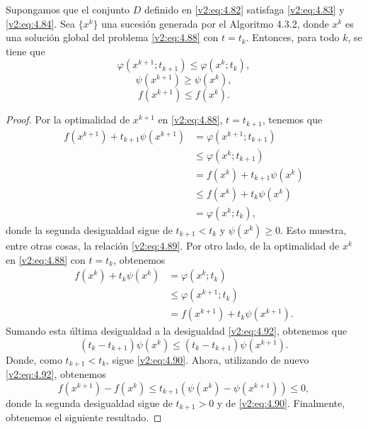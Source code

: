 \begin{proposition}\label{v2:prop:4.3.3}
    Supongamos que el conjunto $D$ definido en \eqref{v2:eq:4.82} satisfaga \eqref{v2:eq:4.83} y \eqref{v2:eq:4.84}. Sea $\{x^k\}$ una sucesión generada por el Algoritmo 4.3.2, donde $x^k$ es una solución global del problema \eqref{v2:eq:4.88} con $t = t_k$.
    Entonces, para todo $k$, se tiene que
    \begin{equation}
        \varphi(x^{k+1}; t_{k+1}) \le \varphi(x^k; t_k),
        \label{v2:eq:4.89}
    \end{equation}
    \begin{equation}
        \psi(x^{k+1}) \ge \psi(x^k),
        \label{v2:eq:4.90}
    \end{equation}
    \begin{equation}
        f(x^{k+1}) \le f(x^k).
        \label{v2:eq:4.91}
    \end{equation}
\end{proposition}
\begin{proof}
    Por la optimalidad de $x^{k+1}$ en \eqref{v2:eq:4.88}, $t = t_{k+1}$, tenemos que
    \begin{align}
        f(x^{k+1}) + t_{k+1}\psi(x^{k+1}) &= \varphi(x^{k+1}; t_{k+1}) \nonumber \\
        &\le \varphi(x^k; t_{k+1}) \nonumber \\
        &= f(x^k) + t_{k+1}\psi(x^k) \nonumber \\
        &\le f(x^k) + t_k\psi(x^k) \nonumber \\
        &= \varphi(x^k; t_k),
        \label{v2:eq:4.92}
    \end{align}
    donde la segunda desigualdad sigue de $t_{k+1} < t_k$ y $\psi(x^k) \ge 0$. Esto muestra, entre otras cosas, la relación \eqref{v2:eq:4.89}.
    Por otro lado, de la optimalidad de $x^k$ en \eqref{v2:eq:4.88} con $t = t_k$, obtenemos
    \begin{align*}
        f(x^k) + t_k\psi(x^k) &= \varphi(x^k; t_k) \\
        &\le \varphi(x^{k+1}; t_k) \\
        &= f(x^{k+1}) + t_k\psi(x^{k+1}).
    \end{align*}
    Sumando esta última desigualdad a la desigualdad \eqref{v2:eq:4.92}, obtenemos que
    \[
        (t_k - t_{k+1})\psi(x^k) \le (t_k - t_{k+1})\psi(x^{k+1}).
    \]
    Donde, como $t_{k+1} < t_k$, sigue \eqref{v2:eq:4.90}.
    Ahora, utilizando de nuevo \eqref{v2:eq:4.92}, obtenemos
    \[
        f(x^{k+1}) - f(x^k) \le t_{k+1}(\psi(x^k) - \psi(x^{k+1})) \le 0,
    \]
    donde la segunda desigualdad sigue de $t_{k+1} > 0$ y de \eqref{v2:eq:4.90}.
    Finalmente, obtenemos el siguiente resultado.
\end{proof}

